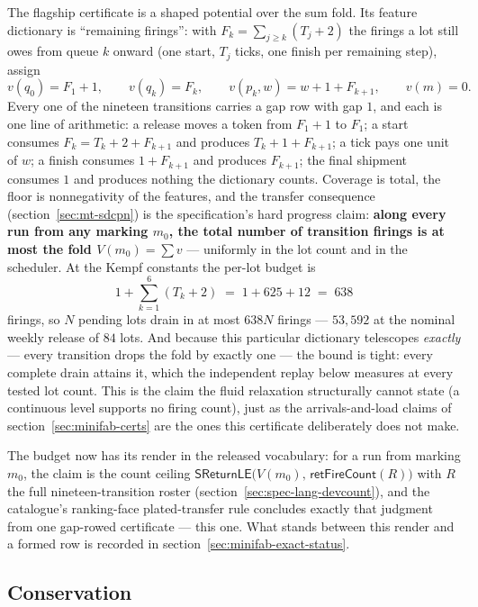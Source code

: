 The flagship certificate is a shaped potential over the sum fold.
Its feature dictionary is ``remaining firings'': with
$F_k = \sum_{j \ge k} (T_j + 2)$ the firings a lot still owes from
queue $k$ onward (one start, $T_j$ ticks, one finish per remaining
step), assign
\[
  v(q_0) = F_1 + 1, \qquad
  v(q_k) = F_k, \qquad
  v(p_k, w) = w + 1 + F_{k+1}, \qquad
  v(m) = 0 .
\]
Every one of the nineteen transitions carries a gap row with gap $1$,
and each is one line of arithmetic: a release moves a token from
$F_1 + 1$ to $F_1$; a start consumes $F_k = T_k + 2 + F_{k+1}$ and
produces $T_k + 1 + F_{k+1}$; a tick pays one unit of $w$; a finish
consumes $1 + F_{k+1}$ and produces $F_{k+1}$; the final shipment
consumes $1$ and produces nothing the dictionary counts. Coverage is
total, the floor is nonnegativity of the features, and the transfer
consequence (section~\ref{sec:mt-sdcpn}) is the specification's hard
progress claim: \textbf{along every run from any marking $m_0$, the
total number of transition firings is at most the fold
$V(m_0) = \sum v$} --- uniformly in the lot count and in the
scheduler. At the Kempf constants the per-lot budget is
\[
  1 + \sum_{k=1}^{6} (T_k + 2) \;=\; 1 + 625 + 12 \;=\; 638
\]
firings, so $N$ pending lots drain in at most $638N$ firings ---
$53{,}592$ at the nominal weekly release of $84$ lots. And because
this particular dictionary telescopes \emph{exactly} --- every
transition drops the fold by exactly one --- the bound is tight: every
complete drain attains it, which the independent replay below
measures at every tested lot count. This is the claim the fluid
relaxation structurally cannot state (a continuous level supports no
firing count), just as the arrivals-and-load claims of
section~\ref{sec:minifab-certs} are the ones this certificate
deliberately does not make.

The budget now has its render in the released vocabulary: for a run
from marking $m_0$, the claim is the count ceiling
$\mathsf{SReturnLE}\bigl(V(m_0),\, \mathsf{retFireCount}(R)\bigr)$
with $R$ the full nineteen-transition roster
(section~\ref{sec:spec-lang-devcount}), and the catalogue's
ranking-face plated-transfer rule concludes exactly that judgment
from one gap-rowed certificate --- this one. What stands between
this render and a formed row is recorded in
section~\ref{sec:minifab-exact-status}.

\subsection{Conservation}
\label{sec:minifab-conservation}


